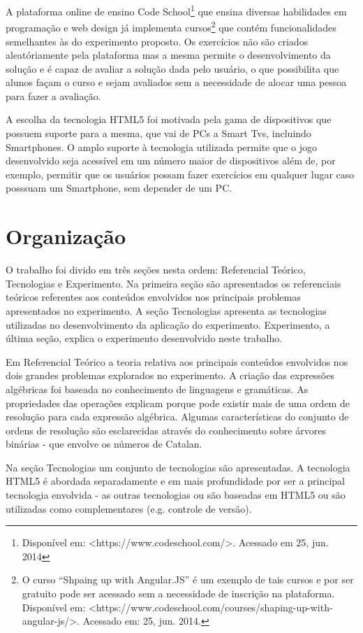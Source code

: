 	A plataforma online de ensino Code School\footnote{Disponível em: <https://www.codeschool.com/>. Acessado em 25, jun. 2014} que ensina diversas habilidades em programação e web design já implementa cursos\footnote{O curso “Shpaing up with Angular.JS” é um exemplo de tais cursos e por ser gratuito pode ser acessado sem a necessidade de inscrição na plataforma. Disponível em: <https://www.codeschool.com/courses/shaping-up-with-angular-js/>. Acessado em: 25, jun. 2014.} que contém funcionalidades semelhantes às do experimento proposto. Os exercícios não são criados aleatóriamente pela plataforma mas a mesma permite o desenvolvimento da solução e é capaz de avaliar a solução dada pelo usuário, o que possibilita que alunos façam o curso e sejam avaliados sem a necessidade de alocar uma pessoa para fazer a avaliação.
	
	A escolha da tecnologia HTML5 foi motivada pela gama de dispositivos que possuem suporte para a mesma, que vai de PCs a Smart Tvs, incluindo Smartphones. O amplo suporte à tecnologia utilizada permite que o jogo desenvolvido seja acessível em um número maior de dispositivos além de, por exemplo, permitir que os usuários possam fazer exercícios em qualquer lugar caso posssuam um Smartphone, sem depender de um PC.
	
\section{Organização}
O trabalho foi divido em três seções nesta ordem: Referencial Teórico, Tecnologias e Experimento. Na primeira seção são apresentados os referenciais teóricos referentes aos conteúdos envolvidos nos principais problemas apresentados no experimento. A seção Tecnologias apresenta as tecnologias utilizadas no desenvolvimento da aplicação do experimento. Experimento, a última seção, explica o experimento desenvolvido neste trabalho. 

Em Referencial Teórico a teoria relativa aos principais conteúdos envolvidos nos dois grandes problemas explorados no experimento. A criação das expressões algébricas foi baseada no conhecimento de linguagens e gramáticas. As propriedades das operações explicam porque pode existir mais de uma ordem de resolução para cada expressão algébrica. Algumas características do conjunto de ordens de resolução são esclarecidas através do conhecimento sobre árvores binárias - que envolve os números de Catalan.

Na seção Tecnologias um conjunto de tecnologias são apresentadas. A tecnologia HTML5 é abordada separadamente e em mais profundidade por ser a principal tecnologia envolvida - as outras tecnologias ou são baseadas em HTML5 ou são utilizadas como complementares (e.g. controle de versão).

